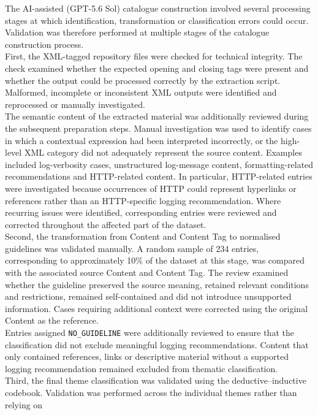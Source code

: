 The AI-assisted (GPT-5.6 Sol) catalogue construction involved several processing stages
at which identification, transformation or classification errors could occur. Validation
was therefore performed at multiple stages of the catalogue construction process.
\\
First, the XML-tagged repository files were checked for technical integrity. The check
examined whether the expected opening and closing tags were present and whether the
output could be processed correctly by the extraction script. Malformed, incomplete or
inconsistent XML outputs were identified and reprocessed or manually investigated.
\\
The semantic content of the extracted material was additionally reviewed during the
subsequent preparation steps. Manual investigation was used to identify cases in which
a contextual expression had been interpreted incorrectly, or the high-level XML category
did not adequately represent the source content. Examples included log-verbosity cases,
unstructured log-message content, formatting-related recommendations and HTTP-related
content. In particular, HTTP-related entries were investigated because occurrences of
HTTP could represent hyperlinks or references rather than an HTTP-specific logging
recommendation. Where recurring issues were identified, corresponding entries were
reviewed and corrected throughout the affected part of the dataset.
\\
Second, the transformation from Content and Content Tag to normalised guidelines was
validated manually. A random sample of 234 entries, corresponding to approximately 10\% of the dataset at this stage, was compared with the associated source Content
and Content Tag. The review examined whether the guideline preserved the source meaning,
retained relevant conditions and restrictions, remained self-contained and did not
introduce unsupported information. Cases requiring additional context were corrected
using the original Content as the reference.
\\
Entries assigned \texttt{NO\_GUIDELINE} were additionally reviewed to ensure that the
classification did not exclude meaningful logging recommendations. Content that only
contained references, links or descriptive material without a supported logging
recommendation remained excluded from thematic classification.
\\
Third, the final theme classification was validated using the deductive–inductive
codebook. Validation was performed across the individual themes rather than relying on
